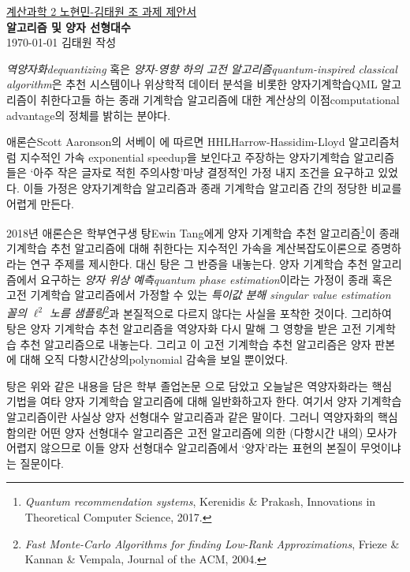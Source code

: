 \documentclass[a4paper,hidelinks]{oblivoir}
\begin{document}
\thispagestyle{empty}
\begin{center}
  \underline{계산과학 2 노현민-김태원 조 과제 제안서} \\
  \textbf{ 알고리즘 및 양자 선형대수} \\ 
  \today\; 김태원 작성
\end{center}
\emph{역양자화\footnotesize dequantizing} 혹은 \emph{양자-영향 하의
고전 알고리즘\footnotesize quantum-inspired classical algorithm}은 추천
시스템이나 위상학적 데이터 분석을 비롯한 양자기계학습{\footnotesize QML}
알고리즘이 취한다고들 하는 종래 기계학습 알고리즘에 대한 계산상의 
이점{\footnotesize computational advantage}의 정체를 밝히는 분야다.

애론슨{\footnotesize Scott Aaronson}의 서베이 에 따르면
HHL{\footnotesize Harrow-Hassidim-Lloyd} 알고리즘처럼 지수적인 가속{\footnotesize
exponential speedup}을 보인다고 주장하는 양자기계학습 알고리즘들은 `아주
작은 글자로 적힌 주의사항'마냥 결정적인 가정 내지 조건을 요구하고 있었다.
이들 가정은 양자기계학습 알고리즘과 종래 기계학습 알고리즘 간의 정당한 비교를
어렵게 만든다.

2018년 애론슨은 학부연구생 탕{\footnotesize Ewin Tang}에게
양자 기계학습 추천 알고리즘\footnote{\emph{Quantum recommendation systems},
  Kerenidis \& Prakash, Innovations in Theoretical Computer Science, 
2017.}이 종래 기계학습 추천 알고리즘에 대해 취한다는 지수적인 가속을 
계산복잡도이론으로 증명하라는 연구 주제를 제시한다. 대신 탕은
그 반증을 내놓는다. 양자 기계학습 추천 알고리즘에서 요구하는 \emph{양자 위상
예측\footnotesize quantum phase estimation}이라는 가정이 종래 혹은
고전 기계학습 알고리즘에서 가정할 수 있는 \emph{특이값 분해{\footnotesize
singular value estimation} 꼴의 $\ell^2$ 노름 샘플링}\footnote{\emph{Fast
Monte-Carlo Algorithms for finding Low-Rank Approximations}, Frieze \& Kannan
\& Vempala, Journal of the ACM, 2004.}과 본질적으로 다르지 않다는 사실을 포착한
것이다. 그리하여 탕은 양자 기계학습 추천 알고리즘을 역양자화 다시 말해 그 영향을
받은 고전 기계학습 추천 알고리즘으로 내놓는다. 그리고 이 고전 기계학습 추천
알고리즘은 양자 판본에 대해 오직 다항시간상의{\tiny polynomial} 감속을 보일
뿐이었다.

탕은 위와 같은 내용을 담은 학부 졸업논문 으로 담았고 오늘날은 역양자화라는 핵심
기법을 여타 양자 기계학습 알고리즘에 대해 일반화하고자 한다. 여기서 양자 기계학습 
알고리즘이란 사실상 양자 선형대수 알고리즘과 같은 말이다. 그러니 역양자화의
핵심 함의란 어떤 양자 선형대수 알고리즘은 고전 알고리즘에 의한 (다항시간 내의) 
모사가 어렵지 않으므로 이들 양자 선형대수 알고리즘에서 `양자'라는 표현의 본질이
무엇이냐는 질문이다. 
\end{document}
